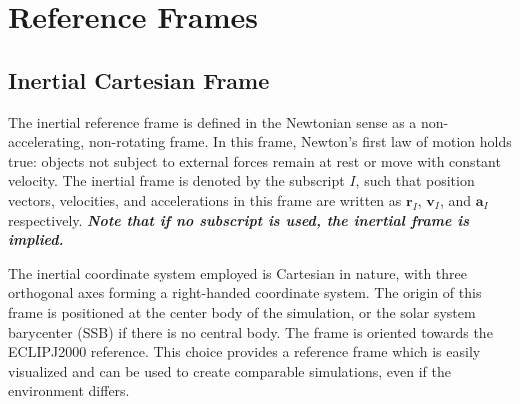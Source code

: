 \chapter{Reference Frames}
\label{chap:reference-frames}
\section{Inertial Cartesian Frame}

The inertial reference frame is defined in the Newtonian sense as a non-accelerating, non-rotating frame. In this frame, Newton's first law of motion holds true: objects not subject to external forces remain at rest or move with constant velocity. The inertial frame is denoted by the subscript $I$, such that position vectors, velocities, and accelerations in this frame are written as $\mathbf{r}_I$, $\mathbf{v}_I$, and $\mathbf{a}_I$ respectively. \textbf{\textit{Note that if no subscript is used, the inertial frame is implied.}}

The inertial coordinate system employed is Cartesian in nature, with three orthogonal axes forming a right-handed coordinate system. The origin of this frame is positioned at the center body of the simulation, or the solar system barycenter (SSB) if there is no central body. The frame is oriented towards the ECLIPJ2000 reference. This choice provides a reference frame which is easily visualized and can be used to create comparable simulations, even if the environment differs.

